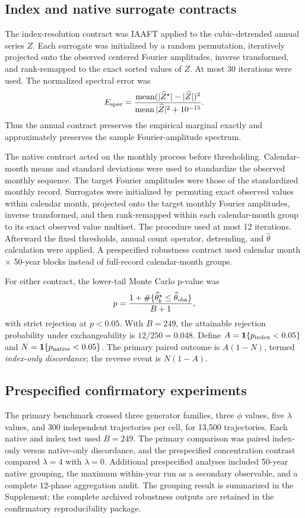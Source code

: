 \subsection{Index and native surrogate contracts}\label{sec:contracts}

The index-resolution contract was IAAFT applied to the cubic-detrended annual series $Z$. Each surrogate was initialized by a random permutation, iteratively projected onto the observed centered Fourier amplitudes, inverse transformed, and rank-remapped to the exact sorted values of $Z$. At most 30 iterations were used. The normalized spectral error was
\[
E_{\rm spec}=
\frac{\operatorname{mean}(|\widehat Z^\star|-|\widehat Z|)^2}
{\operatorname{mean}|\widehat Z|^2+10^{-15}}.
\]
Thus the annual contract preserves the empirical marginal exactly and approximately preserves the sample Fourier-amplitude spectrum.

The native contract acted on the monthly process before thresholding. Calendar-month means and standard deviations were used to standardize the observed monthly sequence. The target Fourier amplitudes were those of the standardized monthly record. Surrogates were initialized by permuting exact observed values within calendar month, projected onto the target monthly Fourier amplitudes, inverse transformed, and then rank-remapped within each calendar-month group to its exact observed value multiset. The procedure used at most 12 iterations. Afterward the fixed thresholds, annual count operator, detrending, and $\widehat\theta$ calculation were applied. A prespecified robustness contract used calendar month $\times$ 50-year blocks instead of full-record calendar-month groups.

For either contract, the lower-tail Monte Carlo p-value was
\[
p=\frac{1+\#\{\widehat\theta_b^\star\le\widehat\theta_{\rm obs}\}}{B+1},
\]
with strict rejection at $p<0.05$. With $B=249$, the attainable rejection probability under exchangeability is $12/250=0.048$. Define $A=\mathbf 1\{p_{\rm index}<0.05\}$ and $N=\mathbf 1\{p_{\rm native}<0.05\}$. The primary paired outcome is $A(1-N)$, termed \emph{index-only discordance}; the reverse event is $N(1-A)$.

\subsection{Prespecified confirmatory experiments}\label{sec:confirmatory}

The primary benchmark crossed three generator families, three $\phi$ values, five $\lambda$ values, and 300 independent trajectories per cell, for 13,500 trajectories. Each native and index test used $B=249$. The primary comparison was paired index-only versus native-only discordance, and the prespecified concentration contrast compared $\lambda=4$ with $\lambda=0$. Additional prespecified analyses included 50-year native grouping, the maximum within-year run as a secondary observable, and a complete 12-phase aggregation audit. The grouping result is summarized in the Supplement; the complete archived robustness outputs are retained in the confirmatory reproducibility package.


